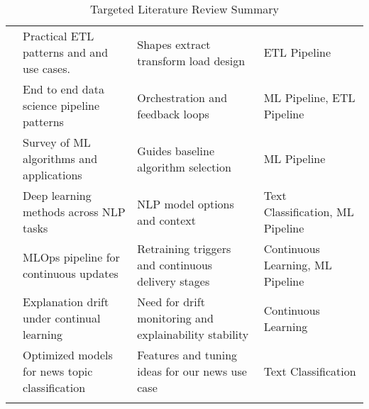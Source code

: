 \begin{longtable}{p{} p{} p{} p{}}
    \cite{kimball:2004}
                       & Practical ETL patterns and and use cases.
                       & Shapes extract transform load design
                       & ETL Pipeline                                                                                              \\

    \cite{kramer:2025}
                       & End to end data science pipeline patterns
                       & Orchestration and feedback loops
                       & ML Pipeline, ETL Pipeline                                                                                 \\
    \cite{khoei:2023}
                       & Survey of ML algorithms and applications
                       & Guides baseline algorithm selection
                       & ML Pipeline                                                                                               \\

    \cite{otter:2021}
                       & Deep learning methods across NLP tasks
                       & NLP model options and context
                       & Text Classification, ML Pipeline                                                                          \\

    \cite{steidl:2023}
                       & MLOps pipeline for continuous updates
                       & Retraining triggers and continuous delivery stages
                       & Continuous Learning, ML Pipeline                                                                          \\
    \cite{cossu:2024}
                       & Explanation drift under continual learning
                       & Need for drift monitoring and explainability stability
                       & Continuous Learning                                                                                       \\
    \cite{daud:2023}
                       & Optimized models for news topic classification
                       & Features and tuning ideas for our news use case
                       & Text Classification                                                                                       \\

    \caption{Targeted Literature Review Summary}
    \label{tab:lit-review}
\end{longtable}
